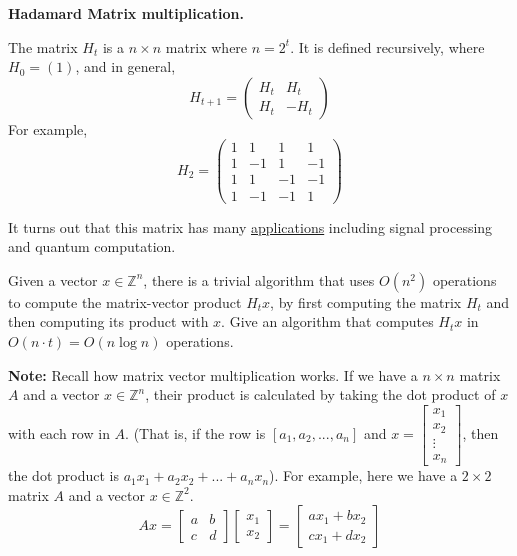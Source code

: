 \documentclass[11pt,addpoints,answers]{exam}
\theoremstyle{plain}            %
\theoremstyle{definition}       %
\theoremstyle{remark}           %
\begin{document}
\begin{questions}
\question[15] \textbf{Hadamard Matrix multiplication.} 


The matrix $H_t$ is a $n\times n$ matrix where $n=2^t$.
It is defined recursively, where $H_0 = (1)$, and in general,
\[
H_{t+1} = \left(
\begin{array}{rr}
H_t  & H_t\\
H_t  & - H_t
\end{array}
\right)
\]
For example,
\[
H_2 = \left(
\begin{array}{rrrr}
1 & 1 & 1 & 1 \\
1 & -1& 1 & -1\\
1 & 1 & -1 & -1\\
1 & -1 & -1 & 1
\end{array}
\right)
\]

It turns out that this matrix has many \href{https://en.wikipedia.org/wiki/Hadamard_matrix#Practical_applications}{applications} including signal processing and quantum computation.

Given a vector $x \in \mathbb{Z}^{n}$, there is a trivial algorithm that uses $O(n^2)$ operations to compute the matrix-vector product $H_t x$, by first computing the matrix $H_t$ and then computing its product with $x$.
Give an algorithm that computes $H_t x$ in $O(n \cdot t)=O(n\log n)$ operations. 


\textbf{Note: } Recall how matrix vector multiplication works. If we have a $n\times n$ matrix $A$ and a vector $x\in \mathbb{Z}^n$, their product is calculated by taking the dot product of $x$ with each row in $A$. (That is, if the row is $[a_1, a_2, ..., a_n]$ and $x = \begin{bmatrix}
       x_1 \\
       x_2 \\
       \vdots \\
       x_n
       \end{bmatrix}$, then the dot product is $a_1x_1 + a_2x_2 + ... + a_nx_n$). For example, here we have a $2\times 2$ matrix $A$ and a vector $x\in \mathbb{Z}^2$.
\begin{equation*}
       A x = 
       \begin{bmatrix}
       a & b \\
       c & d
       \end{bmatrix}
       \begin{bmatrix}
       x_1 \\
       x_2
       \end{bmatrix}
       = 
       \begin{bmatrix}
       ax_1 + bx_2 \\
       cx_1 + dx_2
       \end{bmatrix}
   \end{equation*}


\end{questions}
\end{document}
